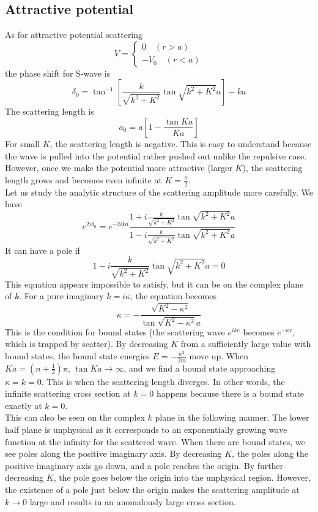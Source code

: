\documentclass[cyan]{elegantnote}
\begin{document}
\subsection{Attractive potential}
As for attractive potential scattering
\[V = \begin{cases} 0 \quad (r > a) \\ -V_0 \quad (r < a)\end{cases}\]
the phase shift for S-wave is
\[\delta_0 = \tan^{-1} \left[\frac{k}{\sqrt{k^2+K^2}} \tan\sqrt{k^2+K^2}a \right]-ka\]
The scattering length is
\[a_0 = a\left[ 1 - \frac{\tan Ka}{Ka} \right] \]
For small $K$, the scattering length is negative. This is easy to understand because the wave is pulled into the potential rather pushed out unlike the repulsive case. However, once we
make the potential more attractive (larger $K$), the scattering length grows and becomes even infinite at $K = \frac{\pi}{2}$.
\\
Let us study the analytic structure of the scattering amplitude more carefully. We have
\[e^{2i\delta_0} = e^{-2ika} \frac{1 + i \frac{k}{\sqrt{k^2+K^2}} \tan\sqrt{k^2+K^2}a}{1 - i \frac{k}{\sqrt{k^2+K^2}} \tan\sqrt{k^2+K^2}a}\]
It can have a pole if
\[1 - i \frac{k}{\sqrt{k^2+K^2}} \tan\sqrt{k^2+K^2}a = 0\]
This equation appears impossible to satisfy, but it can be on the complex plane of $k$. For a pure imaginary $k = i\kappa$, the equation becomes
\[\kappa = - \frac{\sqrt{K^2-\kappa^2}}{\tan \sqrt{K^2-\kappa^2}a}\]
This is the condition for bound states (the scattering wave $e^{ike}$ becomes $e^{-\kappa r}$, which is trapped by scatter). By decreasing $K$ from a sufficiently large value with bound states, the bound state energies $E = -\frac{\kappa^2}{2m}$ move up. When $Ka = (n + \frac{1}{2})\pi$, $\tan Ka \to \infty$, and we find a bound state approaching $\kappa = k = 0$. 
This is when the scattering length diverges. In other words, the infinite scattering cross section at $k = 0$ happens because there is a bound state exactly at $ k = 0$.\\
This can also be seen on the complex $k$ plane in the following manner. The lower half plane is unphysical as it corresponds to an exponentially growing wave function at the infinity for the scattered wave. 
When there are bound states, we see poles along the positive imaginary axis. By decreasing $K$, the poles along the positive imaginary axis go down, and a pole reaches the origin. 
By further decreasing $K$, the pole goes below the origin into the unphysical region. 
However, the existence of a pole just below the origin makes the scattering amplitude at $k \to 0$ large and results in an anomalously large cross section. 
\end{document}

